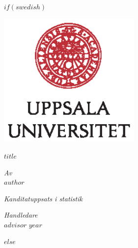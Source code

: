 \documentclass[a4paper,11pt]{article}
\renewcommand{\baselinestretch}{1.5}
\begin{document}
$if(swedish)$
\thispagestyle{empty}
\begin{center}
\includegraphics[width=7cm]{UU_logo_CMYK.eps}
\end{center}
\vspace{1.5cm}
\begin{center}
\begin{Large}
{\bf $title$} 
\end{Large}
\end{center}
\vskip2.5cm
\renewcommand{\baselinestretch}{1}
\begin{center}
{\large\it Av} \\
{\large $author$} 

\vskip2.5cm
\begin{center}
\begin{large}
{\it Kanditatuppsats i statistik}\\
\end{large}
\end{center}
\vskip2cm
{\large\it Handledare}\\
{\large $advisor$} 
\vskip2cm
{\large $year$} 
\end{center}\vfill
$else$
\end{document}
